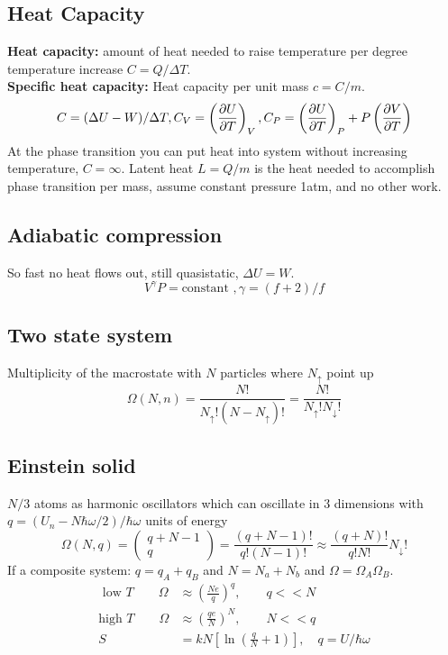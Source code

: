 \documentclass[a4paper, norsk, 8pt]{article}
\begin{document}
\begin{multicols*}{3}
\subsection*{\footnotesize  Heat Capacity}
\textbf{Heat capacity:} amount of heat needed to raise temperature per degree temperature increase $C=Q/\Delta T$.\\
\textbf{Specific heat capacity:} Heat capacity per unit mass $c=C/m$.\\
\begin{equation*}
  C = (\Delta U - W)/\Delta T, C_V = \left(\pdv{U}{T}\right)_V, C_P = \left(\pdv{U}{T}\right)_P + P\left( \pdv{V}{T} \right)
\end{equation*}
At the phase transition you can put heat into system without increasing temperature, $C=\infty$. Latent heat $L=Q/m$ is the heat needed to accomplish phase transition per mass, assume constant pressure 1atm, and no other work.



\subsection*{\footnotesize  Adiabatic compression}
So fast no heat flows out, still quasistatic, $\Delta U = W$.
$$V^{\gamma}P = \text{constant }, \gamma = (f+2)/f$$

\subsection*{\footnotesize  Two state system}
Multiplicity of the macrostate with $N$ particles where $N_{\uparrow}$ point up
\begin{equation}
  \Omega(N, n) = \frac{N!}{N_{\uparrow}! (N-N_{\uparrow})!} =  \frac{N!}{N_{\uparrow}! N_{\downarrow}!}
\end{equation}

\subsection*{\footnotesize  Einstein solid}
$N/3$ atoms as harmonic oscillators which can oscillate in $3$ dimensions with $q=(U_n-N\hbar\omega/2)/\hbar\omega$ units of energy
\begin{equation}
  \Omega(N, q) = \begin{pmatrix} q+N-1 \\ q \end{pmatrix} = \frac{(q+N-1)!}{q! (N-1)!} \approx  \frac{(q+N)!}{q! N!} N_{\downarrow}!
\end{equation}
If a composite system: $q=q_A+q_B$ and $N=N_a+N_b$ and $\Omega = \Omega_A\Omega_B$.
\begin{align*}
  \text{ low $T$}\qquad \Omega &\approx \left(\frac{Ne}{q} \right)^q,  \qquad q << N\\
  \text{high $T$}\qquad \Omega &\approx \left(\frac{qe}{N} \right)^N,  \qquad N << q \\
  S &= kN\left[ \ln{\left( \frac{q}{N} + 1\right)} \right],\quad q = U/\hbar\omega
\end{align*}


\end{multicols*}
\end{document}
